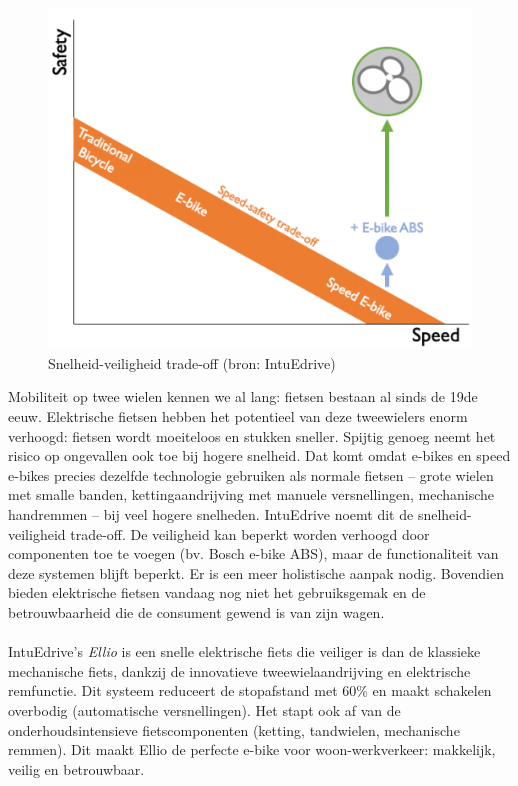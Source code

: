 \begin{figure}
  \centering
  \includegraphics[width=1.1\linewidth]{images/snelheid-veiligheid-tradeoff.png}
  \caption{Snelheid-veiligheid trade-off (bron: IntuEdrive)}
  \label{fig:snelheid-veiligheid trade-off (bron: IntuEdrive)}
\end{figure}
\noindent Mobiliteit op twee wielen kennen we al lang: fietsen bestaan al sinds de 19de eeuw. Elektrische fietsen hebben het potentieel van deze tweewielers enorm verhoogd: fietsen wordt moeiteloos en stukken sneller. Spijtig genoeg neemt het risico op ongevallen ook toe bij hogere snelheid. Dat komt omdat e-bikes en speed e-bikes precies dezelfde technologie gebruiken als normale fietsen – grote wielen met smalle banden, kettingaandrijving met manuele versnellingen, mechanische handremmen – bij veel hogere snelheden. IntuEdrive noemt dit de snelheid-veiligheid trade-off. De veiligheid kan beperkt worden verhoogd door componenten toe te voegen (bv. Bosch e-bike ABS), maar de functionaliteit van deze systemen blijft beperkt. Er is een meer holistische aanpak nodig. Bovendien bieden elektrische fietsen vandaag nog niet het gebruiksgemak en de betrouwbaarheid die de consument gewend is van zijn wagen.
\\\\
IntuEdrive’s \textit{Ellio} is een snelle elektrische fiets die veiliger is dan de klassieke mechanische fiets, dankzij de innovatieve tweewielaandrijving en elektrische remfunctie. Dit systeem reduceert de stopafstand met 60\% en maakt schakelen overbodig (automatische versnellingen). Het stapt ook af van de onderhoudsintensieve fietscomponenten (ketting, tandwielen, mechanische remmen). Dit maakt Ellio de perfecte e-bike voor woon-werkverkeer: makkelijk, veilig en betrouwbaar.
